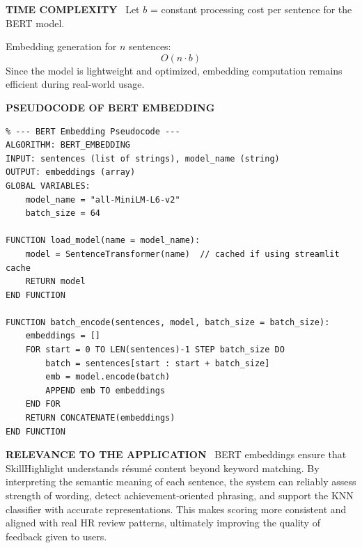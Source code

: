 \documentclass[12pt]{article}
\renewcommand{\paragraph}[1]{\noindent\textbf{\MakeUppercase{#1}}\ }
\begin{document}
\paragraph{TIME COMPLEXITY}
Let $b$ = constant processing cost per sentence for the BERT model.

Embedding generation for $n$ sentences:
\[
O(n \cdot b)
\]
Since the model is lightweight and optimized, embedding computation remains efficient during real-world usage.

\paragraph{PSEUDOCODE OF BERT EMBEDDING}
\begin{verbatim}
% --- BERT Embedding Pseudocode ---
ALGORITHM: BERT_EMBEDDING
INPUT: sentences (list of strings), model_name (string)
OUTPUT: embeddings (array)
GLOBAL VARIABLES:
    model_name = "all-MiniLM-L6-v2"
    batch_size = 64

FUNCTION load_model(name = model_name):
    model = SentenceTransformer(name)  // cached if using streamlit cache
    RETURN model
END FUNCTION

FUNCTION batch_encode(sentences, model, batch_size = batch_size):
    embeddings = []
    FOR start = 0 TO LEN(sentences)-1 STEP batch_size DO
        batch = sentences[start : start + batch_size]
        emb = model.encode(batch)
        APPEND emb TO embeddings
    END FOR
    RETURN CONCATENATE(embeddings)
END FUNCTION
\end{verbatim}

\paragraph{RELEVANCE TO THE APPLICATION}
BERT embeddings ensure that SkillHighlight understands résumé content beyond keyword matching. By interpreting the semantic meaning of each sentence, the system can reliably assess strength of wording, detect achievement-oriented phrasing, and support the KNN classifier with accurate representations. This makes scoring more consistent and aligned with real HR review patterns, ultimately improving the quality of feedback given to users.
\end{document}
